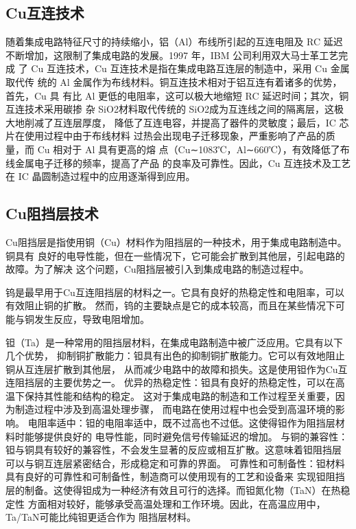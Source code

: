 \documentclass[UTF8,a4paper,12pt]{ctexart}%
\begin{document}
\subsection{Cu互连技术}
随着集成电路特征尺寸的持续缩小，铝（Al）布线所引起的互连电阻及 RC 延迟
不断增加，这限制了集成电路的发展。1997 年，IBM 公司利用双大马士革工艺完成
了 Cu 互连技术，Cu 互连技术是指在集成电路互连层的制造中，采用 Cu 金属取代传
统的 Al 金属作为布线材料。铜互连技术相对于铝互连有着诸多的优势，首先，Cu 具
有比 Al 更低的电阻率，这可以极大地缩短 RC 延迟时间；其次，铜互连技术采用碳掺
杂 SiO2材料取代传统的 SiO2成为互连线之间的隔离层，这极大地削减了互连层厚度，
降低了互连电容，并提高了器件的灵敏度；最后，IC 芯片在使用过程中由于布线材料
过热会出现电子迁移现象，严重影响了产品的质量，而 Cu 相对于 Al 具有更高的熔
点（Cu∼1083℃，Al∼660℃），有效降低了布线金属电子迁移的频率，提高了产品
的良率及可靠性。因此，Cu 互连技术及工艺在 IC 晶圆制造过程中的应用逐渐得到应用。


\subsection{Cu阻挡层技术}
Cu阻挡层是指使用铜（Cu）材料作为阻挡层的一种技术，用于集成电路制造中。铜具有
良好的电导性能，但在一些情况下，它可能会扩散到其他层，引起电路的故障。为了解决
这个问题，Cu阻挡层被引入到集成电路的制造过程中。


钨是最早用于Cu互连阻挡层的材料之一。它具有良好的热稳定性和电阻率，可以有效阻止铜的扩散。
然而，钨的主要缺点是它的成本较高，而且在某些情况下可能与铜发生反应，导致电阻增加。


钽（Ta）是一种常用的阻挡层材料，在集成电路制造中被广泛应用。它具有以下几个优势，
抑制铜扩散能力：钽具有出色的抑制铜扩散能力。它可以有效地阻止铜从互连层扩散到其他层，
从而减少电路中的故障和损失。这是使用钽作为Cu互连阻挡层的主要优势之一。
优异的热稳定性：钽具有良好的热稳定性，可以在高温下保持其性能和结构的稳定。
这对于集成电路的制造和工作过程至关重要，因为制造过程中涉及到高温处理步骤，
而电路在使用过程中也会受到高温环境的影响。
电阻率适中：钽的电阻率适中，既不过高也不过低。这使得钽作为阻挡层材料时能够提供良好的
电导性能，同时避免信号传输延迟的增加。
与铜的兼容性：钽与铜具有较好的兼容性，不会发生显著的反应或相互扩散。这意味着钽阻挡层
可以与铜互连层紧密结合，形成稳定和可靠的界面。
可靠性和可制备性：钽材料具有良好的可靠性和可制备性，制造商可以使用现有的工艺和设备来
实现钽阻挡层的制备。这使得钽成为一种经济有效且可行的选择。而钽氮化物（TaN）在热稳定性
方面相对较好，能够承受高温处理和工作环境。因此，在高温应用中，Ta/TaN可能比纯钽更适合作为
阻挡层材料。
\end{document}

